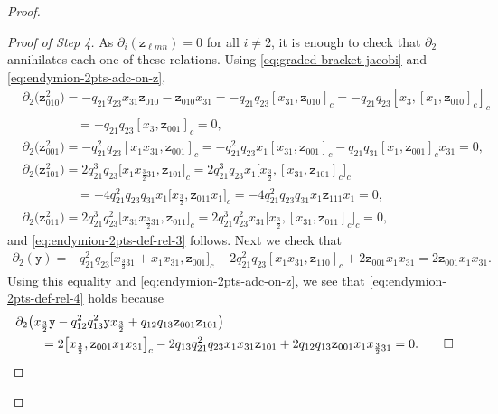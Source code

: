 \documentclass[10pt,a4paper]{amsart}
\providecommand{\qed}{\ensuremath{\square}}
\numberwithin{equation}{section}
\newcommand{\yt}{\mathtt{y}}
\newcommand{\zt}{\mathtt{z}}
\newcommand{\tresdos}{\frac{3}{2}}
\begin{document}
\begin{proof}
\begin{proof}[Proof of Step 4]
As $\partial_i(\zt_{\ell mn})=0$ for all $i\ne 2$, it is enough to check that $\partial_2$ annihilates each one of these relations. Using \eqref{eq:graded-bracket-jacobi} and \eqref{eq:endymion-2pts-adc-on-z},
\begin{align*}
&\partial_2 \big(\zt_{010}^2\big) = -q_{21}q_{23}x_{31}\zt_{010}-\zt_{010}x_{31}
= -q_{21}q_{23}[x_{31}, \zt_{010}]_c
= -q_{21}q_{23}[x_{3}, [x_1,\zt_{010}]_c]_c
\\ &\phantom{\partial_2 (\zt_{010}^2)}
= -q_{21}q_{23}[x_{3}, \zt_{001}]_c =0,
\\
&\partial_2 \big(\zt_{001}^2\big) = -q_{21}^2q_{23}[x_1x_{31}, \zt_{001}]_c
=-q_{21}^2q_{23}x_1[x_{31}, \zt_{001}]_c-q_{21}q_{31}[x_1, \zt_{001}]_cx_{31}=0,
\\
&\partial_2 \big(\zt_{101}^2\big) = 2q_{21}^3q_{23}\big[x_1x_{\tresdos31}, \zt_{101}\big]_c
= 2q_{21}^3q_{23}x_1\big[x_{\tresdos}, [x_{31},\zt_{101}]_c\big]_c
\\&\phantom{\partial_2 (\zt_{101}^2)}
=-4q_{21}^2q_{23}q_{31} x_1\big[x_{\tresdos}, \zt_{011}x_1\big]_c=-4q_{21}^2q_{23}q_{31} x_1\zt_{111}x_1=0,
\\
&\partial_2 \big(\zt_{011}^2\big) = 2q_{21}^3q_{23}^2\big[x_{31}x_{\tresdos31}, \zt_{011}\big]_c
= 2q_{21}^3q_{23}^2x_{31}\big[x_{\tresdos}, [x_{31},\zt_{011}]_c\big]_c=0,
\end{align*}
and \eqref{eq:endymion-2pts-def-rel-3} follows. Next we check that
\begin{align*}
\partial_2 (\yt) = -q_{21}^2q_{23} \big[x_{\tresdos31}+x_1x_{31},\zt_{001}\big]_c-2q_{21}^2q_{23} [x_1x_{31},\zt_{110}]_c+2\zt_{001}x_1x_{31}
 =2\zt_{001}x_1x_{31}.
\end{align*}
Using this equality and \eqref{eq:endymion-2pts-adc-on-z}, we see that \eqref{eq:endymion-2pts-def-rel-4} holds because
\begin{align*}
&\partial_{2} \big(x_{\tresdos}\yt -q_{12}^2q_{13}^2\yt x_{\tresdos}+q_{12}q_{13}\zt_{001}\zt_{101}\big)
\\
&\qquad{}= 2\big[x_{\tresdos}, \zt_{001}x_1x_{31}\big]_c
-2q_{13}q_{21}^2q_{23}x_1x_{31}\zt_{101}+2q_{12}q_{13}\zt_{001} x_1x_{\tresdos31}=0.\tag*{\qed}
\end{align*}
\renewcommand{\qed}{}
\end{proof}




\end{proof}
\end{document}
